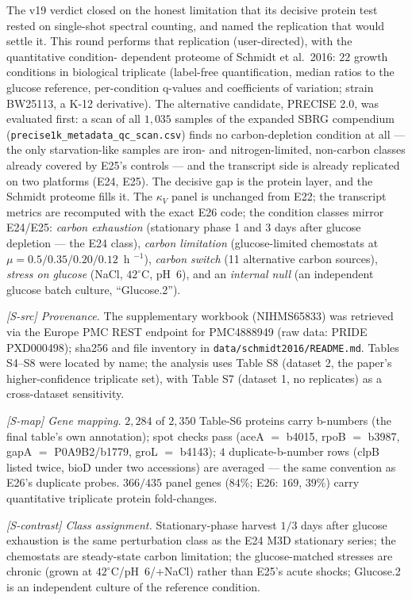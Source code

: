 \documentclass[11pt,a4paper]{article}
\theoremstyle{plain}
\theoremstyle{definition}
\theoremstyle{remark}
\begin{document}
The v19 verdict closed on the honest limitation that its decisive
protein test rested on single-shot spectral counting, and named the
replication that would settle it. This round performs that
replication (user-directed), with the quantitative condition-
dependent proteome of Schmidt et al.\ 2016: $22$ growth conditions
in biological triplicate (label-free quantification, median ratios
to the glucose reference, per-condition q-values and coefficients
of variation; strain BW25113, a K-12 derivative). The alternative
candidate, PRECISE 2.0, was evaluated first: a scan of all
$1{,}035$ samples of the expanded SBRG compendium
(\texttt{precise1k\_metadata\_qc\_scan.csv}) finds no
carbon-depletion condition at all --- the only starvation-like
samples are iron- and nitrogen-limited, non-carbon classes already
covered by E25's controls --- and the transcript side is already
replicated on two platforms (E24, E25). The decisive gap is the
protein layer, and the Schmidt proteome fills it. The $\kappa_V$
panel is unchanged from E22; the transcript metrics are recomputed
with the exact E26 code; the condition classes mirror E24/E25:
\emph{carbon exhaustion} (stationary phase 1 and 3 days after
glucose depletion --- the E24 class), \emph{carbon limitation}
(glucose-limited chemostats at $\mu = 0.5/0.35/0.20/0.12$~h
$^{-1}$), \emph{carbon switch} (11 alternative carbon sources),
\emph{stress on glucose} (NaCl, $42^{\circ}$C, pH~6), and an
\emph{internal null} (an independent glucose batch culture,
``Glucose.2'').

\emph{[S-src] Provenance.} The supplementary workbook
(NIHMS65833) was retrieved via the Europe PMC REST endpoint for
PMC4888949 (raw data: PRIDE PXD000498); sha256 and file inventory
in \texttt{data/schmidt2016/README.md}. Tables S4--S8 were located
by name; the analysis uses Table S8 (dataset 2, the paper's
higher-confidence triplicate set), with Table S7 (dataset 1, no
replicates) as a cross-dataset sensitivity.

\emph{[S-map] Gene mapping.} $2{,}284$ of $2{,}350$ Table-S6
proteins carry b-numbers (the final table's own annotation); spot
checks pass (aceA $=$ b4015, rpoB $=$ b3987, gapA $=$
P0A9B2/b1779, groL $=$ b4143); $4$ duplicate-b-number rows (clpB
listed twice, bioD under two accessions) are averaged --- the same
convention as E26's duplicate probes. $366/435$ panel genes ($84\%$;
E26: $169$, $39\%$) carry quantitative triplicate protein
fold-changes.

\emph{[S-contrast] Class assignment.} Stationary-phase harvest
$1/3$ days after glucose exhaustion is the same perturbation class
as the E24 M3D stationary series; the chemostats are steady-state
carbon limitation; the glucose-matched stresses are chronic (grown
at $42^{\circ}$C/pH~6/+NaCl) rather than E25's acute shocks;
Glucose.2 is an independent culture of the reference condition.
\end{document}
